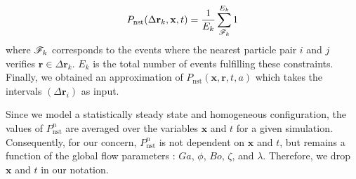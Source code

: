 \begin{equation}
    P_\text{nst}(\Delta\textbf{r}_k,\textbf{x},t)
    = \frac{1}{E_k} 
    \sum^{E_k}_{\mathscr{F}_k} 
    1
    \label{eq:vec_cond}
\end{equation}
where $\mathscr{F}_k$ corresponds to the events where the nearest particle pair $i$ and $j$ verifies $\textbf{r} \in \Delta \textbf{r}_k$.
$E_k$ is the total number of events fulfilling these constraints. 
Finally, we obtained an approximation of $P_\text{nst}(\textbf{x},\textbf{r},t,a)$ which takes the intervals $(\Delta\textbf{r}_i)$ as input.

Since we model a statistically steady state and homogeneous configuration, the values of $P_\text{nst}^n$ are averaged over the variables $\mathbf{x}$ and $t$ for a given simulation. 
Consequently, for our concern, $P_\text{nst}^n$ is not dependent on $\mathbf{x}$ and $t$, but remains a function of the global flow parameters :  $Ga$, $\phi$, $Bo$, $\zeta$, and $\lambda$.
Therefore, we drop $\mathbf{x}$ and $t$ in our notation. 
